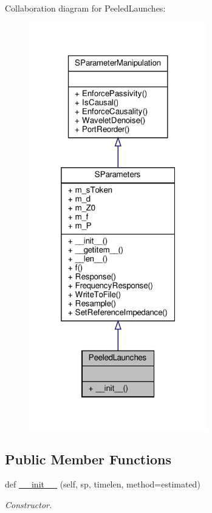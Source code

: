 Collaboration diagram for Peeled\+Launches\+:
\nopagebreak
\begin{figure}[H]
\begin{center}
\leavevmode
\includegraphics[width=220pt]{classSignalIntegrity_1_1ImpedanceProfile_1_1PeeledLaunches_1_1PeeledLaunches__coll__graph}
\end{center}
\end{figure}
\subsection*{Public Member Functions}
\begin{DoxyCompactItemize}
\item 
def \hyperlink{classSignalIntegrity_1_1ImpedanceProfile_1_1PeeledLaunches_1_1PeeledLaunches_a5ad5af04a370e25cc809b024b20dd7ba}{\+\_\+\+\_\+init\+\_\+\+\_\+} (self, sp, timelen, method=\textquotesingle{}estimated\textquotesingle{})
\begin{DoxyCompactList}\small\item\em Constructor. \end{DoxyCompactList}\end{DoxyCompactItemize}


